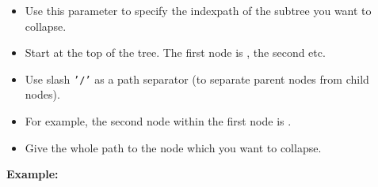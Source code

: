 \begin{itemize}
\item Use this parameter to specify the indexpath of the subtree you want to collapse.
\item Start at the top of the tree. The first node is , the second  etc.
\item Use slash {\tt '/'} as a path separator (to separate parent nodes from child nodes).
\item For example, the second node within the first node is . 
\item Give the whole path to the node which you want to collapse.
\end{itemize}


\textbf{Example:}

